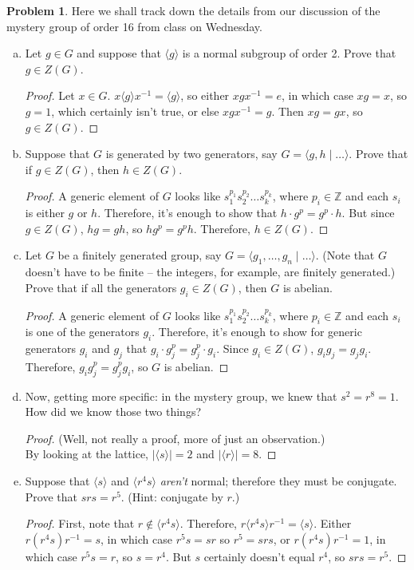 \documentclass[12pt]{article}
\theoremstyle{definition} %
\newtheorem{problem}{Problem}
\newcommand{\Z}{\mathbb{Z}}
\newcommand\inv{^{-1}} %
\def\<{\langle}
\def\>{\rangle}
\begin{document}
\begin{problem} Here we shall track down the details from our discussion of the mystery group of order 16 from class on Wednesday.
    \begin{enumerate}[(a)]
        \item Let $g\in G$ and suppose that $\<g\>$ is a normal subgroup of order 2. Prove that $g\in Z(G)$.
        \begin{proof}
            Let $x\in G$. $x\<g\>x\inv = \<g\>$, so either $xgx\inv = e$, in which case $xg = x$, so $g = 1$, which certainly isn't true, or else $xgx\inv = g$. Then $xg = gx$, so $g \in Z(G)$.
        \end{proof}
        \item Suppose that $G$ is generated by two generators, say $G = \<g, h \mid \ldots \>$. Prove that if $g\in Z(G)$, then $h\in Z(G)$.
        \begin{proof}
            A generic element of $G$ looks like $s_1^{p_1} s_2^{p_2} \ldots s_k^{p_k}$, where $p_i \in \Z$ and each $s_i$ is either $g$ or $h$. Therefore, it's enough to show that $h\cdot g^p = g^p \cdot h$. But since $g\in Z(G)$, $hg = gh$, so $hg^p = g^ph$. Therefore, $h\in Z(G)$.
        \end{proof}
        \item Let $G$ be a finitely generated group, say $G = \<g_1, \ldots, g_n \mid \ldots\>$. (Note that $G$ doesn't have to be finite -- the integers, for example, are finitely generated.) Prove that if all the generators $g_i \in Z(G)$, then $G$ is abelian.
        \begin{proof}
            A generic element of $G$ looks like $s_1^{p_1} s_2^{p_2} \ldots s_k^{p_k}$, where $p_i \in \Z$ and each $s_i$ is one of the generators $g_i$. Therefore, it's enough to show for generic generators $g_i$ and $g_j$ that $g_i \cdot g_j^p = g_j^p \cdot g_i$. Since $g_i \in Z(G)$, $g_i g_j = g_j g_i$. Therefore, $g_i g_j^p = g_j^p g_i$, so $G$ is abelian.
        \end{proof}
        \item Now, getting more specific: in the mystery group, we knew that $s^2 = r^8 = 1$. How did we know those two things?

        \begin{proof}
            (Well, not really a proof, more of just an observation.) \\
            By looking at the lattice, $|\<s\>| = 2$ and $|\<r\>| = 8$.
        \end{proof}
        \item Suppose that $\<s\>$ and $\<r^4s\>$ \textit{aren't} normal; therefore they must be conjugate. Prove that $srs = r^5$. (Hint: conjugate by $r$.)

        \begin{proof}
            First, note that $r\not\in \<r^4s\>$. Therefore, $r\<r^4s\>r\inv = \<s\>$. Either $r(r^4s)r\inv = s$, in which case $r^5s = sr$ so $r^5 = srs$, or $r(r^4s)r\inv = 1$, in which case $r^5s = r$, so $s = r^4$. But $s$ certainly doesn't equal $r^4$, so $srs = r^5$.
        \end{proof}
    \end{enumerate}
\end{problem}
\end{document}
